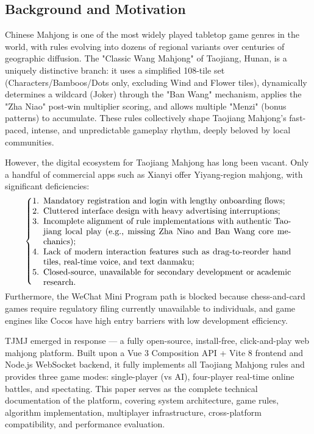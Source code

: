 \documentclass[11pt,a4paper]{article}
\begin{document}
\subsection{Background and Motivation}

Chinese Mahjong is one of the most widely played tabletop game genres in the world, with rules evolving into dozens of regional variants over centuries of geographic diffusion. The "Classic Wang Mahjong" of Taojiang, Hunan, is a uniquely distinctive branch: it uses a simplified 108-tile set (Characters/Bamboos/Dots only, excluding Wind and Flower tiles), dynamically determines a wildcard (Joker) through the "Ban Wang" mechanism, applies the "Zha Niao" post-win multiplier scoring, and allows multiple "Menzi" (bonus patterns) to accumulate. These rules collectively shape Taojiang Mahjong's fast-paced, intense, and unpredictable gameplay rhythm, deeply beloved by local communities.

However, the digital ecosystem for Taojiang Mahjong has long been vacant. Only a handful of commercial apps such as Xianyi offer Yiyang-region mahjong, with significant deficiencies:
\[
\left\{\begin{minipage}{0.88\linewidth}
\begin{enumerate}[nosep,leftmargin=*]
  \item Mandatory registration and login with lengthy onboarding flows;
  \item Cluttered interface design with heavy advertising interruptions;
  \item Incomplete alignment of rule implementations with authentic Taojiang local play (e.g., missing Zha Niao and Ban Wang core mechanics);
  \item Lack of modern interaction features such as drag-to-reorder hand tiles, real-time voice, and text danmaku;
  \item Closed-source, unavailable for secondary development or academic research.
\end{enumerate}
\end{minipage}
\right.
\]
Furthermore, the WeChat Mini Program path is blocked because chess-and-card games require regulatory filing currently unavailable to individuals, and game engines like Cocos have high entry barriers with low development efficiency.

TJMJ emerged in response — a fully open-source, install-free, click-and-play web mahjong platform. Built upon a Vue 3 Composition API + Vite 8 frontend and Node.js WebSocket backend, it fully implements all Taojiang Mahjong rules and provides three game modes: single-player (vs AI), four-player real-time online battles, and spectating. This paper serves as the complete technical documentation of the platform, covering system architecture, game rules, algorithm implementation, multiplayer infrastructure, cross-platform compatibility, and performance evaluation.
\end{document}
